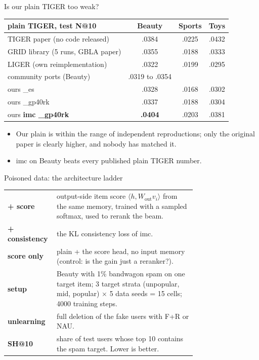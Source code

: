 \documentclass{beamer}
\begin{document}
\begin{frame}{Is our plain TIGER too weak?}
\centering
\small
\begin{tabular}{lccc}
\toprule
plain TIGER, test N@10            & Beauty & Sports & Toys \\
\midrule
TIGER paper (no code released)    & .0384 & .0225 & .0432 \\
GRID library (5 runs, GBLA paper) & .0355 & .0188 & .0333 \\
LIGER (own reimplementation)      & .0322 & .0199 & .0295 \\
community ports (Beauty)          & .0319 to .0354 & & \\
\midrule
ours \_es                         & .0328 & .0168 & .0302 \\
ours \_gp40rk                     & .0337 & .0188 & .0304 \\
\midrule
ours \textbf{imc \_gp40rk}        & \textbf{.0404} & .0203 & .0381 \\
\bottomrule
\end{tabular}

\medskip
\begin{itemize}\footnotesize
  \item Our plain is within the range of independent reproductions; only the
        original paper is clearly higher, and nobody has matched it.
  \item imc on Beauty beats every published plain TIGER number.
\end{itemize}
\end{frame}

\begin{frame}{Poisoned data: the architecture ladder}
\small
\begin{tabular}{@{}l p{0.74\linewidth}@{}}
\toprule
\textbf{+ score}       & output-side item score $\langle h, W_{\text{out}} v_i\rangle$
                         from the same memory, trained with a sampled softmax,
                         used to rerank the beam. \\
\textbf{+ consistency} & the KL consistency loss of imc. \\
\textbf{score only}    & plain + the score head, no input memory (control:
                         is the gain just a reranker?). \\
\midrule
\textbf{setup}         & Beauty with 1\% bandwagon spam on one target item;
                         3 target strata (unpopular, mid, popular) $\times$ 5
                         data seeds = 15 cells; 4000 training steps. \\
\textbf{unlearning}    & full deletion of the fake users with F+R or NAU. \\
\textbf{SH@10}         & share of test users whose top 10 contains the spam
                         target. Lower is better. \\
\bottomrule
\end{tabular}
\end{frame}
\end{document}
